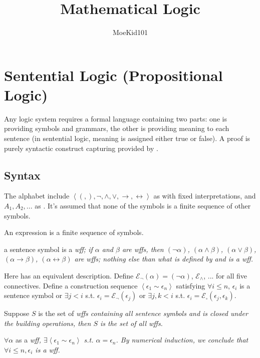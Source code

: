 \documentclass{article}
\title{\textbf{\huge{Mathematical Logic}}}
\author{MoeKid101}
\date{}
\newcommand \mlist[1]				{\left\langle #1 \right\rangle}
\renewcommand \iff					{\leftrightarrow}
\begin{document}
\maketitle

\section{Sentential Logic (Propositional Logic)}

Any logic system requires a formal language containing two parts: one is  providing symbols and grammars, the other is  providing meaning to each sentence (in sentential logic, meaning is assigned either true or false). A proof is purely syntactic construct capturing  provided by .

\subsection{Syntax}

The alphabet include $\mlist{(, ), \neg, \land, \lor, \to, \iff}$ as  with fixed interpretations, and $A_1, A_2, ...$ as . It's assumed that none of the symbols is a finite sequence of other symbols.

	An expression is a finite sequence of symbols.

	 a sentence symbol is a \it{wff};  if $\alpha$ and $\beta$ are \it{wff}s, then $(\neg \alpha)$, $(\alpha \land \beta)$, $(\alpha \lor \beta)$, $(\alpha \to \beta)$, $(\alpha \iff \beta)$ are \it{wff}s;  nothing else than what is defined by  and  is a \it{wff}.
	
	Here  has an equivalent description. Define $\mathcal{E}_{\neg}(\alpha)=(\neg\alpha)$, $\mathcal{E}_{\land}$, ... for all five connectives. Define a construction sequence $\mlist{\epsilon_1 \sim \epsilon_n}$ satisfying $\forall i \le n$, $\epsilon_i$ is a sentence symbol or $\exists j<i$ s.t. $\epsilon_i=\mathcal{E}_{\neg}(\epsilon_j)$ or $\exists j,k<i$ s.t. $\epsilon_i=\mathcal{E}_{\square}(\epsilon_j,\epsilon_k)$.
	
	 Suppose $S$ is the set of \it{wff}s containing all sentence symbols and is closed under the building operations, then $S$ is the set of all \it{wff}s.
	
	\Proof
	$\forall \alpha$ as a \it{wff}, $\exists \mlist{\epsilon_1\sim\epsilon_n}$ s.t. $\alpha=\epsilon_n$. By numerical induction, we conclude that $\forall i \le n, \epsilon_i$ is a \it{wff}.
	
\end{document}
